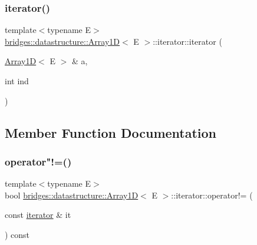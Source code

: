 \subsubsection{\texorpdfstring{iterator()}{iterator()}}
{\footnotesize\ttfamily template$<$typename E$>$ \\
\hyperlink{classbridges_1_1datastructure_1_1_array1_d}{bridges\+::datastructure\+::\+Array1D}$<$ E $>$\+::iterator\+::iterator (\begin{DoxyParamCaption}\item[{\hyperlink{classbridges_1_1datastructure_1_1_array1_d}{Array1D}$<$ E $>$ \&}]{a,  }\item[{int}]{ind }\end{DoxyParamCaption})\hspace{0.3cm}{\ttfamily [inline]}}



\subsection{Member Function Documentation}
\mbox{\label{classbridges_1_1datastructure_1_1_array1_d_1_1iterator_ab9e885078d2bb6068efa5ef899b7e32b}} 
\subsubsection{\texorpdfstring{operator"!=()}{operator!=()}}
{\footnotesize\ttfamily template$<$typename E$>$ \\
bool \hyperlink{classbridges_1_1datastructure_1_1_array1_d}{bridges\+::datastructure\+::\+Array1D}$<$ E $>$\+::iterator\+::operator!= (\begin{DoxyParamCaption}\item[{const \hyperlink{classbridges_1_1datastructure_1_1_array1_d_1_1iterator}{iterator} \&}]{it }\end{DoxyParamCaption}) const\hspace{0.3cm}{\ttfamily [inline]}}

\mbox{\label{classbridges_1_1datastructure_1_1_array1_d_1_1iterator_a847f7a113b05007499eac3dca011ba5d}} 
